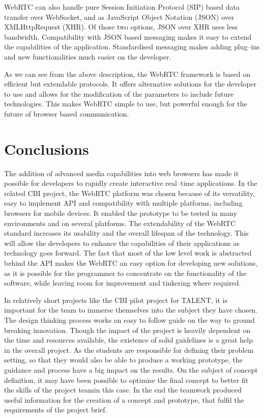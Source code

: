 \documentclass[english,12pt,a4paper,pdftex]{article}
\begin{document}
WebRTC can also handle pure Session Initiation Protocol (SIP) based data transfer over WebSocket, and as JavaScript Object Notation (JSON) over XMLHttpRequest (XHR). Of those two options, JSON over XHR uses less bandwidth. \cite{Adeyeye} Compatibility with JSON based messaging makes it easy to extend the capabilities of the application. Standardised messaging makes adding plug--ins and new functionalities much easier on the developer.

As we can see from the above description, the WebRTC framework is based on efficient but extendable protocols. It offers alternative solutions for the developer to use and allows for the modification of the parameters to include future technologies. This makes WebRTC simple to use, but powerful enough for the future of browser based communication.


\clearpage


\section{Conclusions}

The addition of advanced media capabilities into web browsers has made it possible for developers to rapidly create interactive real--time applications. In the related CBI project, the WebRTC platform was chosen because of its versatility, easy to implement API and compatibility with multiple platforms, including browsers for mobile devices. It enabled the prototype to be tested in many environments and on several platforms. The extendability of the WebRTC standard increases its usability and the overall lifespan of the technology. This will allow the developers to enhance the capabilities of their applications as technology goes forward. The fact that most of the low level work is abstracted behind the API makes the WebRTC an easy option for developing new solutions, as it is possible for the programmer to concentrate on the functionality of the software, while leaving room for improvement and tinkering where required.

In relatively short projects like the CBI pilot project for TALENT, it is important for the team to immerse themselves into the subject they have chosen. The design thinking process works an easy to follow guide on the way to ground breaking innovation. Though the impact of the project is heavily dependent on the time and resources available, the existence of solid guidelines is a great help in the overall project. As the students are responsible for defining their problem setting, so that they would also be able to produce a working prototype, the guidance and process have a big impact on the results. On the subject of concept definition, it may have been possible to optimise the final concept to better fit the skills of the project teamin this case. In the end the teamwork produced useful information for the creation of a concept and prototype, that fulfil the requirements of the project brief.
\end{document}
